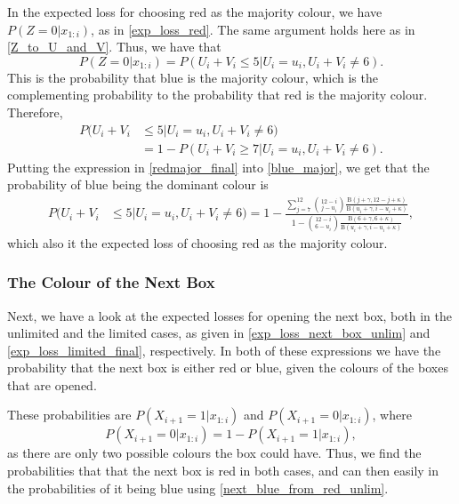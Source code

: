 In the expected loss for choosing red as the majority colour, we have $P(Z=0|x_{1:i})$, as in \eqref{exp_loss_red}. The same argument holds here as in \eqref{Z_to_U_and_V}. Thus, we have that
\begin{equation}
    P(Z=0|x_{1:i}) = P(U_i+V_i \leq 5 | U_i=u_i,U_i+V_i \neq 6).
\end{equation}
This is the probability that blue is the majority colour, which is the complementing probability to the probability that red is the majority colour. Therefore,
\begin{equation}
\label{blue_major}
    \begin{aligned}
        P(U_i+V_i& \leq 5 | U_i=u_i,U_i+V_i \neq 6) \\
        &= 1 - P(U_i+V_i \geq 7 | U_i=u_i,U_i+V_i \neq 6).
    \end{aligned}
\end{equation}
Putting the expression in \eqref{redmajor_final} into \eqref{blue_major}, we get that the probability of blue being the dominant colour is
\begin{equation}
\label{blue_major_final}
    \begin{aligned}
        P(U_i+V_i& \leq 5 | U_i=u_i,U_i+V_i \neq 6) 
        = 1 - \frac{\sum_{j=7}^{12} \binom{12-i}{j-u_i} \frac{\text{B}(j+\gamma,12-j+\kappa)}{\text{B}(u_i+\gamma,i-u_i+\kappa)}}{1-\binom{12-i}{6-u_i} \frac{\text{B}(6+\gamma,6+\kappa)}{\text{B}(u_i+\gamma,i-u_i+\kappa)}},
    \end{aligned}
\end{equation}
which also it the expected loss of choosing red as the majority colour. 

\subsubsection{The Colour of the Next Box}
Next, we have a look at the expected losses for opening the next box, both in the unlimited and the limited cases, as given in \eqref{exp_loss_next_box_unlim} and \eqref{exp_loss_limited_final}, respectively. In both of these expressions we have the probability that the next box is either red or blue, given the colours of the boxes that are opened. 

These probabilities are $P(X_{i+1}=1|x_{1:i})$ and $P(X_{i+1}=0|x_{1:i})$, where 
\begin{equation}
\label{next_blue_from_red_unlim}
    P(X_{i+1}=0|x_{1:i}) = 1 - P(X_{i+1}=1|x_{1:i}),
\end{equation}
as there are only two possible colours the box could have. Thus, we find the probabilities that that the next box is red in both cases, and can then easily in the probabilities of it being blue using \eqref{next_blue_from_red_unlim}. 

